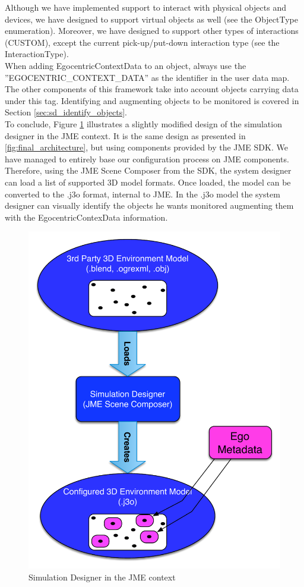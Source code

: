 Although we have implemented support to interact with physical objects and devices, we have designed to support virtual objects as well (see the ObjectType enumeration). Moreover, we have designed to support other types of interactions (CUSTOM), except the current pick-up/put-down interaction type (see the InteractionType).\\

When adding EgocentricContextData to an object, always use the ''EGOCENTRIC\_CONTEXT\_DATA'' as the identifier in the user data map. The other components of this framework take into account objects carrying data under this tag. Identifying and augmenting objects to be monitored is covered in Section \ref{sec:sd_identify_objects}.\\

To conclude, Figure \ref{fig:impl_simulation_designer} illustrates a slightly modified design of the simulation designer in the JME context. It is the same design as presented in \ref{fig:final_architecture}, but using components provided by the JME SDK. We have managed to entirely base our configuration process on JME components. Therefore, using the JME Scene Composer from the SDK, the system designer can load a list of supported 3D model formats. Once loaded, the model can be converted to the .j3o format, internal to JME. In the .j3o model the system designer can visually identify the objects he wants monitored augmenting them with the EgocentricContexData information.\\
\begin{figure}[H]
	\centering
	\includegraphics[width=\linewidth]{gfx/Chapter4/simulation_designer}
	\caption{Simulation Designer in the JME context}
	\label{fig:impl_simulation_designer}
\end{figure}
